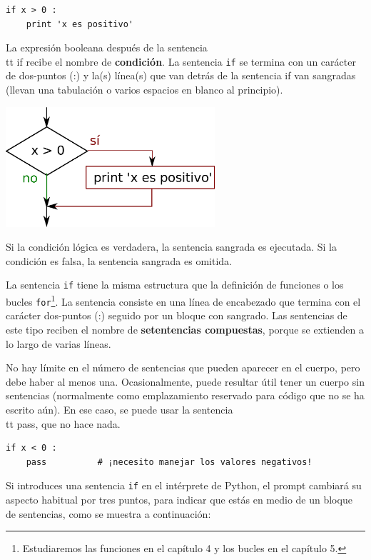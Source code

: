 \beforeverb
\begin{verbatim}
if x > 0 :
    print 'x es positivo'
\end{verbatim}
\afterverb
%
La expresión booleana después de la sentencia {\\tt if} recibe
el nombre de {\bf condición}. La sentencia {\tt if} se termina
con un carácter de dos-puntos (:) y la(s) línea(s) que van detrás de
la sentencia if van sangradas (llevan una tabulación o varios espacios en blanco al principio).

\beforefig
\centerline{\includegraphics[height=1.75in]{figs2/if.eps}}
\afterfig

Si la condición lógica es verdadera, la sentencia sangrada
es ejecutada. Si la condición es falsa,
la sentencia sangrada es omitida.


La sentencia {\tt if} tiene la misma estructura que la definición de funciones
o los bucles {\tt for}\footnote{Estudiaremos las funciones en el capítulo 4
y los bucles en el capítulo 5.}. La sentencia consiste en una línea de encabezado
que termina con el carácter dos-puntos (:)
seguido por un bloque con sangrado. Las sentencias de este tipo
reciben el nombre de {\bf setentencias compuestas}, porque se extienden
a lo largo de varias líneas.

No hay límite en el número de sentencias que pueden aparecer en el
cuerpo, pero debe haber al menos una.
Ocasionalmente, puede resultar útil tener un cuerpo sin sentencias
(normalmente como emplazamiento reservado para código que no se ha escrito aún). En ese
caso, se puede usar la sentencia {\\tt pass}, que no hace nada.


\beforeverb
\begin{verbatim}
if x < 0 :
    pass          # ¡necesito manejar los valores negativos!
\end{verbatim}
\afterverb
%
Si introduces una sentencia {\tt if} en el intérprete de Python, el prompt cambiará
su aspecto habitual por tres puntos, para indicar que estás en medio de un bloque de sentencias, como
se muestra a continuación:

